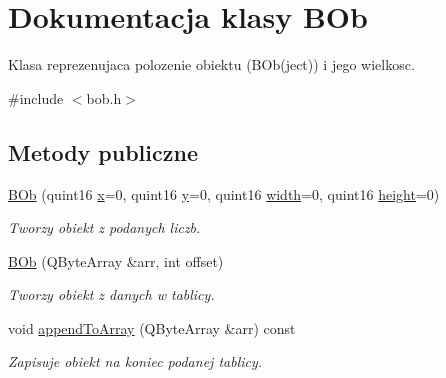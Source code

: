 \hypertarget{class_b_ob}{
\section{Dokumentacja klasy BOb}
\label{class_b_ob}
}


Klasa reprezenujaca polozenie obiektu (BOb(ject)) i jego wielkosc.  


{\ttfamily \#include $<$bob.h$>$}\subsection*{Metody publiczne}
\begin{DoxyCompactItemize}
\item 
\hypertarget{class_b_ob_a92b178c878148ae33171e5aeae305045}{
\hyperlink{class_b_ob_a92b178c878148ae33171e5aeae305045}{BOb} (quint16 \hyperlink{class_b_ob_a5dcc6a3c2f4ffaf3d630187e853dd876}{x}=0, quint16 \hyperlink{class_b_ob_ada96bf49e446d3f9a5ce02f36e44c9b4}{y}=0, quint16 \hyperlink{class_b_ob_a3e1652784396111952cd16a77a666a2b}{width}=0, quint16 \hyperlink{class_b_ob_ac406681bc6029dc6e41aa53791e9f210}{height}=0)}
\label{class_b_ob_a92b178c878148ae33171e5aeae305045}

\begin{DoxyCompactList}\small\item\em Tworzy obiekt z podanych liczb. \item\end{DoxyCompactList}\item 
\hyperlink{class_b_ob_ab71739ff83cf58d15b42f26274c583d1}{BOb} (QByteArray \&arr, int offset)
\begin{DoxyCompactList}\small\item\em Tworzy obiekt z danych w tablicy. \item\end{DoxyCompactList}\item 
void \hyperlink{class_b_ob_a11fbd7ab4c8dda600232b40b02a20cbe}{appendToArray} (QByteArray \&arr) const 
\begin{DoxyCompactList}\small\item\em Zapisuje obiekt na koniec podanej tablicy. \item\end{DoxyCompactList}\end{DoxyCompactItemize}
